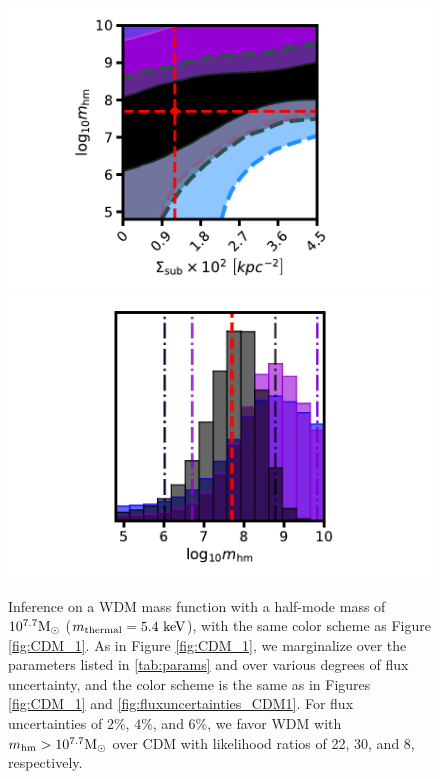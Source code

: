 \begin{figure}
	\includegraphics[clip,trim=2cm 0cm 3.5cm
	0.25cm,width=.48\textwidth,keepaspectratio]{./figures_LOSforward/WDM_246_77_joint.pdf}
	\includegraphics[clip,trim=2cm 0cm 3.5cm
	0.5cm,width=.48\textwidth,keepaspectratio]{./figures_LOSforward/WDM_246_77_mhm.pdf}
	\caption[Joint posterior distribution of the normalization of the SHMF and the half-mode mass from WDM mock data (1)]{\label{fig:WDM_1} Inference on a WDM mass function with a half-mode mass of $10^{7.7} {\rm{M}_{\odot}}$ ($m_{\rm{thermal}} = 5.4 \ \rm{keV}$), with the same color scheme as Figure \ref{fig:CDM_1}. As in Figure \ref{fig:CDM_1}, we marginalize over the parameters listed in \ref{tab:params} and over various degrees of flux uncertainty, and the color scheme is the same as in Figures \ref{fig:CDM_1} and \ref{fig:fluxuncertainties_CDM1}. For flux uncertainties of $2\%$, $4\%$, and $6\%$, we favor WDM with ${m_{\rm{hm}}} > 10^{7.7} {\rm{M}_{\odot}}$ over CDM with likelihood ratios of 22, 30, and 8, respectively.}
\end{figure}	
